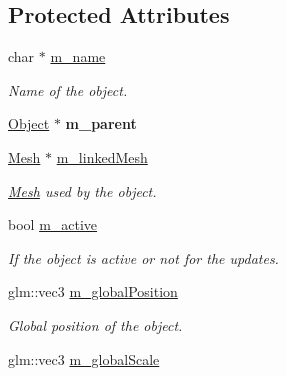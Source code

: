 \subsection*{Protected Attributes}
\begin{DoxyCompactItemize}
\item 
\mbox{\label{class_object_ab37ae04046c449f0a8ab2833cfee5353}} 
char $\ast$ \hyperlink{class_object_ab37ae04046c449f0a8ab2833cfee5353}{m\+\_\+name}
\begin{DoxyCompactList}\small\item\em Name of the object. \end{DoxyCompactList}\item 
\mbox{\label{class_object_a2ee3d966f96dbabae641ad390d82a6f3}} 
\hyperlink{class_object}{Object} $\ast$ {\bfseries m\+\_\+parent}
\item 
\mbox{\label{class_object_a82441da4d382a765bcf9c0a929f0a240}} 
\hyperlink{class_mesh}{Mesh} $\ast$ \hyperlink{class_object_a82441da4d382a765bcf9c0a929f0a240}{m\+\_\+linked\+Mesh}
\begin{DoxyCompactList}\small\item\em \hyperlink{class_mesh}{Mesh} used by the object. \end{DoxyCompactList}\item 
\mbox{\label{class_object_a9f5194b69d79120761526865270df0a6}} 
bool \hyperlink{class_object_a9f5194b69d79120761526865270df0a6}{m\+\_\+active}
\begin{DoxyCompactList}\small\item\em If the object is active or not for the updates. \end{DoxyCompactList}\item 
\mbox{\label{class_object_a6628ff13c375c8a2bc9cc36c8585943c}} 
glm\+::vec3 \hyperlink{class_object_a6628ff13c375c8a2bc9cc36c8585943c}{m\+\_\+global\+Position}
\begin{DoxyCompactList}\small\item\em Global position of the object. \end{DoxyCompactList}\item 
\mbox{\label{class_object_ad717cc77240082806b13cd67338a4923}} 
glm\+::vec3 \hyperlink{class_object_ad717cc77240082806b13cd67338a4923}{m\+\_\+global\+Scale}

\end{DoxyCompactItemize}
